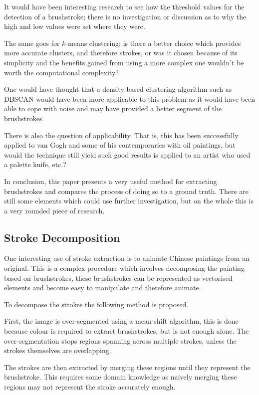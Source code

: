 \documentclass[conference]{IEEEtran}
\begin{document}
It would have been interesting research to see how the threshold values for the
detection of a brushstroke; there is no investigation or discussion as to why
the high and low values were set where they were.

The same goes for $k$-means clustering; is there a better choice which provides
more accurate clusters, and therefore strokes, or was it chosen because of its
simplicity and the benefits gained from using a more complex one wouldn't be
worth the computational complexity?

One would have thought that a density-based clustering algorithm such as
DBSCAN\cite{kriegel11density} would have been more applicable to this problem
as it would have been able to cope with noise and may have provided a better
segment of the brushstrokes.

There is also the question of applicability. That is, this has been 
successfully applied to van Gogh and some of his contemporaries with oil
paintings, but would the technique still yield such good results is applied to
an artist who used a palette knife, etc.?

In conclusion, this paper presents a very useful method for extracting
brushstrokes and compares the process of doing so to a ground truth. There are
still some elements which could use further investigation, but on the whole
this is a very rounded piece of research.

\subsection{Stroke Decomposition}

One interesting use of stroke extraction is to animate Chinese paintings from
an original\cite{xu2006animating}. This is a complex procedure which involves
decomposing the painting based on brushstrokes, these brushstrokes can be
represented as vectorised elements and become easy to manipulate and therefore
animate.

To decompose the strokes the following method is proposed.

First, the image is over-segmented using a mean-shift algorithm, this is done
because colour is required to extract brushstrokes, but is not enough alone.
The over-segmentation stops regions spanning across multiple strokes, unless
the strokes themselves are overlapping.

The strokes are then extracted by merging these regions until they represent
the brushstroke. This requires some domain knowledge as naively merging these
regions may not represent the stroke accurately enough.
\end{document}
